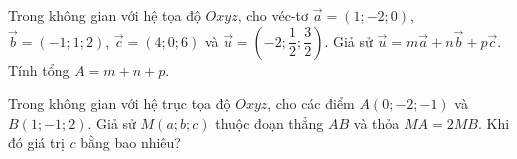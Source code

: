 \begin{ex}%
	Trong không gian với hệ tọa độ $Oxyz$, cho véc-tơ $\overrightarrow{a}=(1;-2;0)$, $\overrightarrow{b}=(-1;1;2)$, $\overrightarrow{c}=(4;0;6)$ và $\overrightarrow{u}=\left(-2;\dfrac{1}{2};\dfrac{3}{2}\right)$. Giả sử $\overrightarrow{u}=m\overrightarrow{a}+n\overrightarrow{b}+p\overrightarrow{c}$. Tính tổng $A=m+n+p$.
\end{ex}
\begin{ex}%
	Trong không gian với hệ trục tọa độ $Oxyz$, cho các điểm $A(0;-2;-1)$ và $B(1;-1;2)$. Giả sử $M(a;b;c)$ thuộc đoạn thẳng $AB$ và thỏa $MA=2MB$. Khi đó giá trị $c$ bằng bao nhiêu?
\end{ex}	
